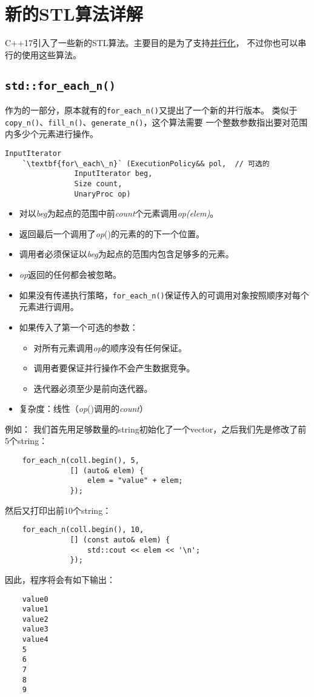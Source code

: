 \chapter{新的STL算法详解}\label{ch23}
C++17引入了一些新的STL算法。主要目的是为了支持\hyperref[ch22]{并行化}，
不过你也可以串行的使用这些算法。


\section{\texttt{std::for\_each\_n()}}
作为的一部分，原本就有的\texttt{for\_each\_n()}又提出了一个新的并行版本。
类似于\texttt{copy\_n()}、\texttt{fill\_n()}、\texttt{generate\_n()}，这个算法需要
一个整数参数指出要对范围内多少个元素进行操作。
\begin{lstlisting}[frame=single,xleftmargin=13pt,xrightmargin=13pt]
    InputIterator
    `\textbf{for\_each\_n}` (ExecutionPolicy&& pol,  // 可选的
                InputIterator beg,
                Size count,
                UnaryProc op)
\end{lstlisting}
\begin{itemize}
    \item 对以\emph{beg}为起点的范围中前\emph{count}个元素调用\emph{op(elem)}。
    \item 返回最后一个调用了\emph{op}()的元素的的下一个位置。
    \item 调用者必须保证以\emph{beg}为起点的范围内包含足够多的元素。
    \item \emph{op}返回的任何都会被忽略。
    \item 如果没有传递执行策略，\texttt{for\_each\_n()}保证传入的可调用对象按照顺序对每个元素进行调用。
    \item 如果传入了第一个可选的参数：
    \begin{itemize}
        \item 对所有元素调用\emph{op}的顺序没有任何保证。
        \item 调用者要保证并行操作不会产生数据竞争。
        \item 迭代器必须至少是前向迭代器。
    \end{itemize}
    \item 复杂度：线性（\emph{op}()调用的\emph{count}）
\end{itemize}
例如：
我们首先用足够数量的string初始化了一个vector，之后我们先是修改了前5个string：
\begin{lstlisting}
    for_each_n(coll.begin(), 5,
               [] (auto& elem) {
                   elem = "value" + elem;
               });
\end{lstlisting}
然后又打印出前10个string：
\begin{lstlisting}
    for_each_n(coll.begin(), 10,
               [] (const auto& elem) {
                   std::cout << elem << '\n';
               });
\end{lstlisting}
因此，程序将会有如下输出：
\begin{lstlisting}
    value0
    value1
    value2
    value3
    value4
    5
    6
    7
    8
    9
\end{lstlisting}


